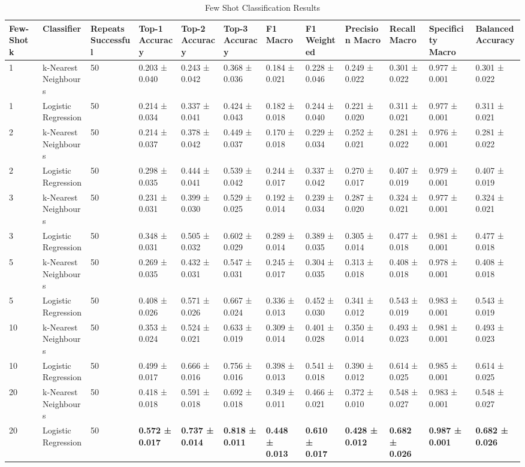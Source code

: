 
\begin{table}[ht]
\centering
\tiny  %
\caption{Few Shot Classification Results}
\label{tab:few_shotclassification_results}
\begin{tabularx}{\textwidth}{lXXXXXXXXXXX}
\toprule
Few-Shot k & Classifier & Repeats Successful & Top-1 Accuracy & Top-2 Accuracy & Top-3 Accuracy & F1 Macro & F1 Weighted & Precision Macro & Recall Macro & Specificity Macro & Balanced Accuracy \\
\midrule
1 & k-Nearest Neighbours & 50 & 0.203 ± 0.040 & 0.243 ± 0.042 & 0.368 ± 0.036 & 0.184 ± 0.021 & 0.228 ± 0.046 & 0.249 ± 0.022 & 0.301 ± 0.022 & 0.977 ± 0.001 & 0.301 ± 0.022 \\
1 & Logistic Regression & 50 & 0.214 ± 0.034 & 0.337 ± 0.041 & 0.424 ± 0.043 & 0.182 ± 0.018 & 0.244 ± 0.040 & 0.221 ± 0.020 & 0.311 ± 0.021 & 0.977 ± 0.001 & 0.311 ± 0.021 \\
2 & k-Nearest Neighbours & 50 & 0.214 ± 0.037 & 0.378 ± 0.042 & 0.449 ± 0.037 & 0.170 ± 0.018 & 0.229 ± 0.034 & 0.252 ± 0.021 & 0.281 ± 0.022 & 0.976 ± 0.001 & 0.281 ± 0.022 \\
2 & Logistic Regression & 50 & 0.298 ± 0.035 & 0.444 ± 0.041 & 0.539 ± 0.042 & 0.244 ± 0.017 & 0.337 ± 0.042 & 0.270 ± 0.017 & 0.407 ± 0.019 & 0.979 ± 0.001 & 0.407 ± 0.019 \\
3 & k-Nearest Neighbours & 50 & 0.231 ± 0.031 & 0.399 ± 0.030 & 0.529 ± 0.025 & 0.192 ± 0.014 & 0.239 ± 0.034 & 0.287 ± 0.020 & 0.324 ± 0.021 & 0.977 ± 0.001 & 0.324 ± 0.021 \\
3 & Logistic Regression & 50 & 0.348 ± 0.031 & 0.505 ± 0.032 & 0.602 ± 0.029 & 0.289 ± 0.014 & 0.389 ± 0.035 & 0.305 ± 0.014 & 0.477 ± 0.018 & 0.981 ± 0.001 & 0.477 ± 0.018 \\
5 & k-Nearest Neighbours & 50 & 0.269 ± 0.035 & 0.432 ± 0.031 & 0.547 ± 0.031 & 0.245 ± 0.017 & 0.304 ± 0.035 & 0.313 ± 0.018 & 0.408 ± 0.018 & 0.978 ± 0.001 & 0.408 ± 0.018 \\
5 & Logistic Regression & 50 & 0.408 ± 0.026 & 0.571 ± 0.026 & 0.667 ± 0.024 & 0.336 ± 0.013 & 0.452 ± 0.030 & 0.341 ± 0.012 & 0.543 ± 0.019 & 0.983 ± 0.001 & 0.543 ± 0.019 \\
10 & k-Nearest Neighbours & 50 & 0.353 ± 0.024 & 0.524 ± 0.021 & 0.633 ± 0.019 & 0.309 ± 0.014 & 0.401 ± 0.028 & 0.350 ± 0.014 & 0.493 ± 0.023 & 0.981 ± 0.001 & 0.493 ± 0.023 \\
10 & Logistic Regression & 50 & 0.499 ± 0.017 & 0.666 ± 0.016 & 0.756 ± 0.016 & 0.398 ± 0.013 & 0.541 ± 0.018 & 0.390 ± 0.012 & 0.614 ± 0.025 & 0.985 ± 0.001 & 0.614 ± 0.025 \\
20 & k-Nearest Neighbours & 50 & 0.418 ± 0.018 & 0.591 ± 0.018 & 0.692 ± 0.018 & 0.349 ± 0.011 & 0.466 ± 0.021 & 0.372 ± 0.010 & 0.548 ± 0.027 & 0.983 ± 0.001 & 0.548 ± 0.027 \\
20 & Logistic Regression & 50 & \textbf{0.572 ± 0.017} & \textbf{0.737 ± 0.014} & \textbf{0.818 ± 0.011} & \textbf{0.448 ± 0.013} & \textbf{0.610 ± 0.017} & \textbf{0.428 ± 0.012} & \textbf{0.682 ± 0.026} & \textbf{0.987 ± 0.001} & \textbf{0.682 ± 0.026} \\
\bottomrule
\bottomrule
\end{tabularx}
\end{table}

